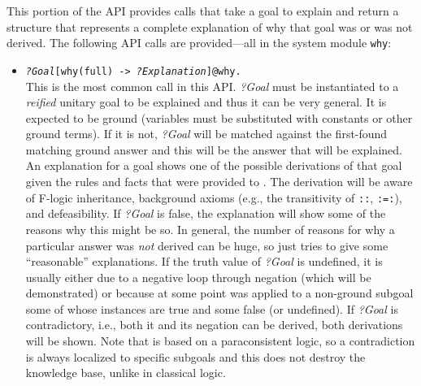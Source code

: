 This portion of the API provides calls that take a goal to explain and
return a structure that represents a
complete explanation of why that goal was or
was not derived. The following API calls are provided---all in the system
module \texttt{\bs{}why}:
\begin{itemize}
\item \texttt{\textnormal{\emph{?Goal}}[why(full) ->
    \texttt{\textnormal{\emph{?Explanation}}}]@\bs{}why.}
  \\
  This is the most common call in this API. \emph{?Goal} must be
  instantiated to a \emph{reified} unitary goal to be explained and thus it
  can be very general. It is expected
  to be ground (variables must be substituted with constants or other
  ground terms). If it is not, \emph{?Goal} will be matched against the
  first-found matching ground answer and this will be the answer that will
  be explained. An explanation for a goal shows one of the possible
  derivations of that goal given the rules and facts that were provided to
  \ERGO.  The derivation will be aware of F-logic inheritance, background
  axioms (e.g., the transitivity of \texttt{::}, \texttt{:=:}), and
  defeasibility.  If \emph{?Goal} is false, the explanation will show some of
  the reasons why this might be so. In general, the number of reasons
  for why a particular answer was \emph{not} derived 
  can be huge, so \ERGO just tries to give some ``reasonable''
  explanations.  If the truth value of \emph{?Goal} is undefined, it is
  usually either due to a negative loop through negation (which will be
  demonstrated) or because at some point \texttt{\RULELOGNAF} was applied
  to a non-ground subgoal some of whose instances are true and some false
  (or undefined).  If \emph{?Goal} is contradictory, i.e., both it and its
  negation can be derived, both derivations will be shown. Note that \ERGO
  is based on a paraconsistent logic, so a contradiction is always
  localized to specific subgoals and this does not destroy the knowledge
  base, unlike in classical logic.


\end{itemize}

